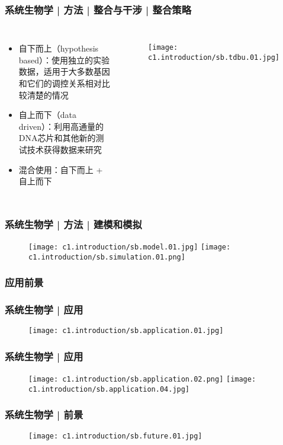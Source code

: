 \begin{frame}
  \frametitle{系统生物学 | 方法 | 整合与干涉 | 整合策略}
  \begin{columns}
    \begin{itemize}
    \item 自下而上（hypothesis based）：使用独立的实验数据，适用于大多数基因和它们的调控关系相对比较清楚的情况
    \item 自上而下（data driven）：利用高通量的DNA芯片和其他新的测试技术获得数据来研究
    \item 混合使用：自下而上 + 自上而下
  \end{itemize}
  \begin{figure}
    \centering
    \texttt{[image: c1.introduction/sb.tdbu.01.jpg]}
  \end{figure}
  \end{columns}
\end{frame}

\begin{frame}
  \frametitle{系统生物学 | 方法 | 建模和模拟}
  \begin{figure}
    \centering
    \texttt{[image: c1.introduction/sb.model.01.jpg]}
    \texttt{[image: c1.introduction/sb.simulation.01.png]}
  \end{figure}
\end{frame}

\subsubsection{应用前景}
\begin{frame}
  \frametitle{系统生物学 | 应用}
  \begin{figure}
    \centering
    \texttt{[image: c1.introduction/sb.application.01.jpg]}
  \end{figure}
\end{frame}

\begin{frame}
  \frametitle{系统生物学 | 应用}
  \begin{figure}
    \centering
    \texttt{[image: c1.introduction/sb.application.02.png]}
    \texttt{[image: c1.introduction/sb.application.04.jpg]}
  \end{figure}
\end{frame}

\begin{frame}
  \frametitle{系统生物学 | 前景}
  \begin{figure}
    \centering
    \texttt{[image: c1.introduction/sb.future.01.jpg]}
  \end{figure}
\end{frame}
